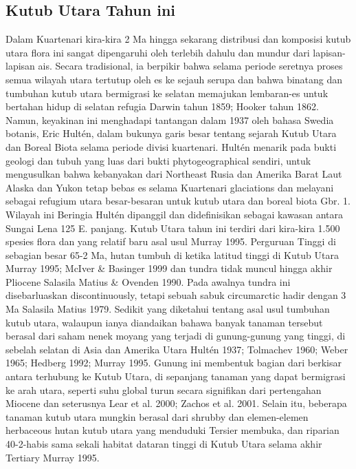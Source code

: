 \subsection{Kutub Utara Tahun ini}

		Dalam Kuartenari {kira-kira 2 Ma hingga sekarang} distribusi dan komposisi kutub utara flora ini sangat dipengaruhi oleh terlebih dahulu dan mundur dari 
	lapisan-lapisan ais. Secara tradisional, ia berpikir bahwa selama periode seretnya proses semua wilayah utara tertutup oleh es ke sejauh serupa dan bahwa
	binatang dan tumbuhan kutub utara bermigrasi ke selatan memajukan lembaran-es untuk bertahan hidup di selatan refugia {Darwin tahun 1859; Hooker tahun 1862}.
	Namun, keyakinan ini menghadapi tantangan dalam 1937 oleh bahasa Swedia botanis, Eric Hultén, dalam bukunya garis besar tentang sejarah Kutub Utara dan 
	Boreal Biota selama periode divisi kuartenari. Hultén menarik pada bukti geologi dan tubuh yang luas dari bukti phytogeographical sendiri, untuk mengusulkan
	bahwa kebanyakan dari Northeast Rusia dan Amerika Barat Laut {Alaska dan Yukon} tetap bebas es selama Kuartenari glaciations dan melayani sebagai refugium 
	utara besar-besaran untuk kutub utara dan boreal biota {Gbr. 1}. Wilayah ini Beringia Hultén dipanggil dan didefinisikan sebagai kawasan antara Sungai Lena 
	{125 E. panjang.}
		Kutub Utara tahun ini terdiri dari kira-kira 1.500 spesies flora dan yang relatif baru asal usul {Murray 1995}. Perguruan Tinggi di sebagian besar {65-2 Ma}, 
	hutan tumbuh di ketika latitud tinggi di Kutub Utara {Murray 1995; McIver \& Basinger 1999} dan tundra tidak muncul hingga akhir Pliocene {Salasila Matius \& Ovenden 1990}.
	Pada awalnya tundra ini disebarluaskan discontinuously, tetapi sebuah sabuk circumarctic hadir dengan 3 Ma {Salasila Matius 1979}. 
	Sedikit yang diketahui tentang asal usul tumbuhan kutub utara, walaupun ianya diandaikan bahawa banyak tanaman tersebut berasal dari saham nenek moyang yang terjadi 
	di gunung-gunung yang tinggi, di sebelah selatan di Asia dan Amerika Utara {Hultén 1937; Tolmachev 1960; Weber 1965; Hedberg 1992; Murray 1995}. Gunung ini membentuk 
	bagian dari berkisar antara terhubung ke Kutub Utara, di sepanjang tanaman yang dapat bermigrasi ke arah utara, seperti suhu global turun secara signifikan dari 
	pertengahan Miocene dan seterusnya {Lear et al. 2000; Zachos et al. 2001}. Selain itu, beberapa tanaman kutub utara mungkin berasal dari shrubby dan elemen-elemen 
	herbaceous hutan kutub utara yang menduduki Tersier membuka, dan riparian {40-2}-habis sama sekali habitat dataran tinggi di Kutub Utara selama akhir 
	Tertiary {Murray 1995}.
	
